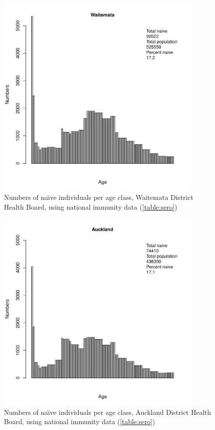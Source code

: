 \documentclass{article}
\begin{document}
\begin{figure}[H]
     \begin{center}
     \includegraphics[width=0.9\textwidth]{dhb2.pdf}
     \end{center}
     \caption{Numbers of na\"{\i}ve individuals per age class, Waitemata District Health Board, using national immunity data (\autoref{table:sero})}
     \label{fig:Waitemata}
\end{figure}

\begin{figure}[H]
     \begin{center}
     \includegraphics[width=0.9\textwidth]{dhb3.pdf}
     \end{center}
     \caption{Numbers of na\"{\i}ve individuals per age class, Auckland District Health Board, using national immunity data (\autoref{table:sero})}
     \label{fig:Auckland}
\end{figure}
\end{document}
